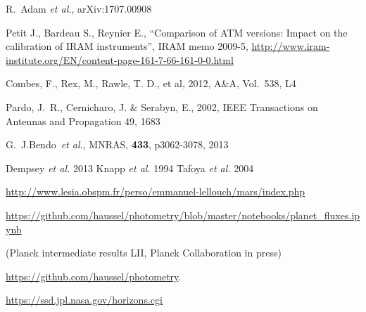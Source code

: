 
\begin{thebibliography}{99}
  
 R.~Adam {\it et al.}, arXiv:1707.00908
  
Petit J., Bardeau S., Reynier E., ``Comparison of ATM versions: Impact
on the calibration of IRAM instruments'', IRAM memo 2009-5, \url{http://www.iram-institute.org/EN/content-page-161-7-66-161-0-0.html}

 Combes, F., Rex, M., Rawle, T. D., et al, 2012, A\&A,
  Vol.~538, L4

  Pardo, J.~R., Cernicharo, J. $\&$ Serabyn, E.,
  2002, IEEE Transactions on Antennas and Propagation 49, 1683


  
  G.~J.Bendo~{\it et al.}, MNRAS, {\bf 433}, p{3062-3078}, 2013 
  
  
 Dempsey {\it et al.} 2013
 Knapp {\it et al.} 1994
 Tafoya {\it et al.} 2004

\url{http://www.lesia.obspm.fr/perso/emmanuel-lellouch/mars/index.php}

\url{https://github.com/haussel/photometry/blob/master/notebooks/planet_fluxes.ipynb}

(Planck intermediate results LII, Planck
Collaboration in press)

\url{https://github.com/haussel/photometry}.

\url{https://ssd.jpl.nasa.gov/horizons.cgi}


\end{thebibliography}
